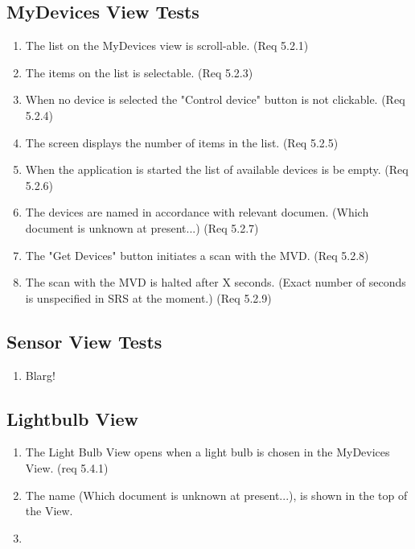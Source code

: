 \documentclass[a4paper]{article}
\begin{document}
\begin{appendices}
\subsection{MyDevices View Tests}
\begin{enumerate}[label=\bfseries Test \thesubsection.\arabic*,labelwidth=\widthof{\text{Test 10.10.10}},leftmargin=!]
    \item The list on the MyDevices view is scroll-able. (Req 5.2.1)
    \item The items on the list is selectable. (Req 5.2.3)
    \item When no device is selected the "Control device" button is not clickable. (Req 5.2.4)
    \item The screen displays the number of items in the list. (Req 5.2.5)
    \item When the application is started the list of available devices is be empty. (Req 5.2.6)
    \item The devices are named in accordance with relevant documen. (Which document is unknown at present...) (Req 5.2.7)
    \item The "Get Devices" button initiates a scan with the MVD. (Req 5.2.8)
    \item The scan with the MVD is halted after X seconds. (Exact number of seconds is unspecified in SRS at the moment.) (Req 5.2.9)
\end{enumerate}

\subsection{Sensor View Tests}
\begin{enumerate}[label=\bfseries Test \thesubsection.\arabic*,labelwidth=\widthof{\text{Test 10.10.10}},leftmargin=!]
\item Blarg!
\end{enumerate}

\subsection{Lightbulb View}
\begin{enumerate}[label=\bfseries Test \thesubsection.\arabic*,labelwidth=\widthof{\text{Test 10.10.10}},leftmargin=!]
    \item The Light Bulb View opens when a light bulb is chosen in the MyDevices View. (req 5.4.1)
    \item The name (Which document is unknown at present...), is shown in the top of the View.
    \item
\end{enumerate} 


\end{appendices}
\end{document}
